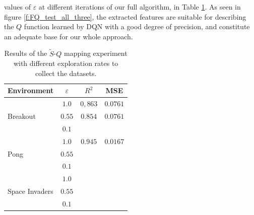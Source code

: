 values of $\varepsilon$ at different iterations of our full algorithm, in 
Table \ref{t:FQ_tests}.
As seen in figure \ref{f:FQ_test_all_three}, the extracted features are suitable
for describing the $Q$ function learned by DQN with a good degree of precision, 
and constitute an adequate base for our whole approach. 
%
\begin{table}
    \centering
    \begin{tabular}{l c c c} 
	\hline
	Environment                     & $\varepsilon$ & $R^2$   & MSE \\ 
	\hline 
	\multirow{3}{*}{Breakout}       & $1.0$         & $0,863$ & $0.0761$ \\
	                                & $0.55$        & $0.854$ & $0.0761$  \\
	                                & $0.1$         & $ $     & $ $ \\
	\hline
	\multirow{3}{*}{Pong}           & $1.0$         & $0.945$ & $0.0167$ \\
	                                & $0.55$        & $ $     & $ $ \\
	                                & $0.1$         & $ $     & $ $ \\
	\hline
	\multirow{3}{*}{Space Invaders} & $1.0$         & $ $     & $ $ \\
	                                & $0.55$        & $ $     & $ $ \\
	                                & $0.1$         & $ $     & $ $ \\
	\hline
    \end{tabular}
    \caption[Results of $\tilde{S}$-$Q$ mapping experiment]{Results of the 
	     $\tilde{S}$-$Q$ mapping experiment with different exploration rates
	     to collect the datasets.}
    \label{t:FQ_tests}
\end{table}
%
%
